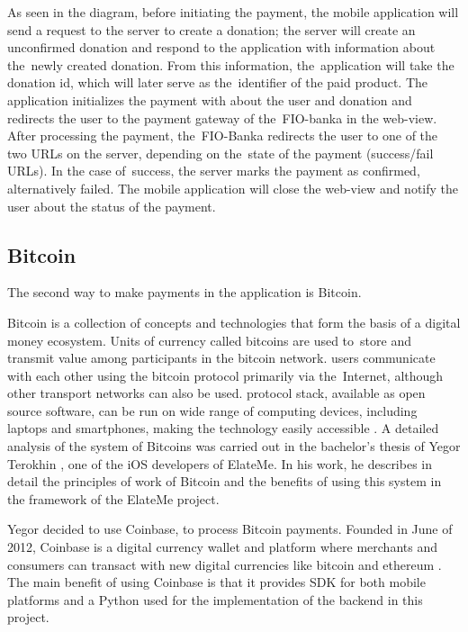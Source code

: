 
As seen in the diagram, before initiating the payment, the mobile application will send a request to the server to
create a donation; the server will create an unconfirmed donation and respond to the application with information about
the~newly created donation. From this information, the~application will take the donation id, which will later serve as
the~identifier of the paid product. The application initializes the payment with   about
the user and donation and redirects the user to the payment gateway of the~FIO-banka in the web-view. After processing
the payment, the~FIO-Banka redirects the user to one of the two URLs on the server, depending on the~state of
the payment (success/fail URLs). In the case of~success, the server marks the payment as confirmed, alternatively
failed. The mobile application will close the web-view and notify the user about the status of the payment.

\subsection{Bitcoin}
The second way to make payments in the application is Bitcoin.

Bitcoin is a collection of concepts and technologies that form the basis of a digital money ecosystem. Units of currency
called bitcoins are used to~store and transmit value among participants in the bitcoin network.  users
communicate with each other using the bitcoin protocol primarily via the~Inter\-net, although other transport networks
can also be used.  protocol stack, available as open source software, can be run on wide range of
computing devices, including laptops and smartphones, making the technology easily accessible \cite{bitcoin}. A detailed
analysis of the system of Bitcoins was carried out in the bachelor's thesis of Yegor Terokhin \cite{ios1}, one of
the iOS developers of ElateMe. In his work, he describes in detail the principles of work of Bitcoin and the benefits
of using this system in the framework of the ElateMe project.

Yegor decided to use Coinbase, to process Bitcoin payments. Founded in June of 2012, Coinbase is a digital currency
wallet and platform where merchants and consumers can transact with new digital currencies like bitcoin and ethereum
\cite{coinbase}. The main benefit of using Coinbase is that it provides \ac{SDK} for both mobile platforms and a Python
used for the implementation of the backend in this project.

